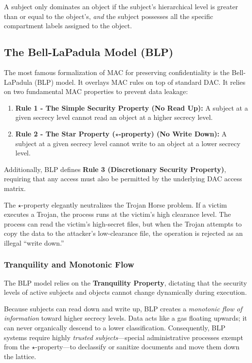 A subject only dominates an object if the subject's hierarchical level is greater than or equal to the object's, \textit{and} the subject possesses all the specific compartment labels assigned to the object.

\subsection{The Bell-LaPadula Model (BLP)}
The most famous formalization of MAC for preserving confidentiality is the Bell-LaPadula (BLP) model. It overlays MAC rules on top of standard DAC. It relies on two fundamental MAC properties to prevent data leakage:
\begin{enumerate}
    \item \textbf{Rule 1 - The Simple Security Property (No Read Up):} A subject at a given secrecy level cannot read an object at a higher secrecy level.
    \item \textbf{Rule 2 - The Star Property ($\star$-property) (No Write Down):} A subject at a given secrecy level cannot write to an object at a lower secrecy level.
\end{enumerate}
Additionally, BLP defines \textbf{Rule 3 (Discretionary Security Property)}, requiring that any access must also be permitted by the underlying DAC access matrix.

The $\star$-property elegantly neutralizes the Trojan Horse problem. If a victim executes a Trojan, the process runs at the victim's high clearance level. The process can read the victim's high-secret files, but when the Trojan attempts to copy the data to the attacker's low-clearance file, the operation is rejected as an illegal ``write down.''

\subsubsection{Tranquility and Monotonic Flow}
The BLP model relies on the \textbf{Tranquility Property}, dictating that the security levels of active subjects and objects cannot change dynamically during execution. 

Because subjects can read down and write up, BLP creates a \textit{monotonic flow of information} toward higher secrecy levels. Data acts like a gas floating upwards; it can never organically descend to a lower classification. Consequently, BLP systems require highly \textit{trusted subjects}—special administrative processes exempt from the $\star$-property—to declassify or sanitize documents and move them down the lattice.

